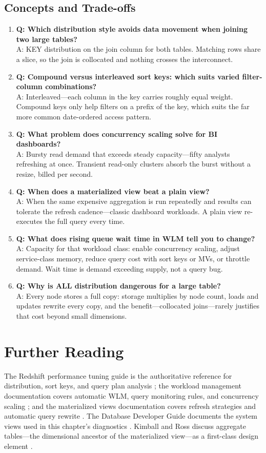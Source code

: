 \subsection{Concepts and Trade-offs}
\begin{enumerate}
    \item \textbf{Q: Which distribution style avoids data movement when joining two large tables?}\\
    A: KEY distribution on the join column for both tables. Matching rows share a slice, so the join is collocated and nothing crosses the interconnect.
    \item \textbf{Q: Compound versus interleaved sort keys: which suits varied filter-column combinations?}\\
    A: Interleaved---each column in the key carries roughly equal weight. Compound keys only help filters on a prefix of the key, which suits the far more common date-ordered access pattern.
    \item \textbf{Q: What problem does concurrency scaling solve for BI dashboards?}\\
    A: Bursty read demand that exceeds steady capacity---fifty analysts refreshing at once. Transient read-only clusters absorb the burst without a resize, billed per second.
    \item \textbf{Q: When does a materialized view beat a plain view?}\\
    A: When the same expensive aggregation is run repeatedly and results can tolerate the refresh cadence---classic dashboard workloads. A plain view re-executes the full query every time.
    \item \textbf{Q: What does rising queue wait time in WLM tell you to change?}\\
    A: Capacity for that workload class: enable concurrency scaling, adjust service-class memory, reduce query cost with sort keys or MVs, or throttle demand. Wait time is demand exceeding supply, not a query bug.
    \item \textbf{Q: Why is ALL distribution dangerous for a large table?}\\
    A: Every node stores a full copy: storage multiplies by node count, loads and updates rewrite every copy, and the benefit---collocated joins---rarely justifies that cost beyond small dimensions.
\end{enumerate}

\section{Further Reading}
The Redshift performance tuning guide is the authoritative reference for distribution, sort keys, and query plan analysis \cite{awsRedshiftPerfTuning}; the workload management documentation covers automatic WLM, query monitoring rules, and concurrency scaling \cite{awsRedshiftWLM}; and the materialized views documentation covers refresh strategies and automatic query rewrite \cite{awsRedshiftMVs}. The Database Developer Guide documents the system views used in this chapter's diagnostics \cite{awsRedshiftDocs}. Kimball and Ross discuss aggregate tables---the dimensional ancestor of the materialized view---as a first-class design element \cite{kimballDWToolkit}.


